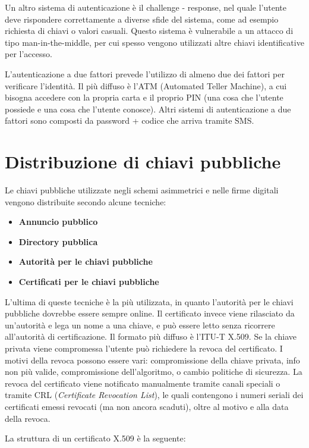 \begin{itemize}
\end{itemize}
Un altro sistema di autenticazione è il challenge - response, nel quale l'utente deve rispondere correttamente a diverse sfide del sistema, come ad esempio richiesta di chiavi o valori casuali. Questo sistema è vulnerabile a un attacco di tipo man-in-the-middle, per cui spesso vengono utilizzati altre chiavi identificative per l'accesso.

L'autenticazione a due fattori prevede l'utilizzo di almeno due dei fattori per verificare l'identità. Il più diffuso è l'ATM (Automated Teller Machine), a cui bisogna accedere con la propria carta e il proprio PIN (una cosa che l'utente possiede e una cosa che l'utente conosce). Altri sistemi di autenticazione a due fattori sono composti da password + codice che arriva tramite SMS.  

\section{Distribuzione di chiavi pubbliche}
Le chiavi pubbliche utilizzate negli schemi asimmetrici e nelle firme digitali vengono distribuite secondo alcune tecniche:
\begin{itemize}
    \item \textbf{Annuncio pubblico}
    \item \textbf{Directory pubblica}
    \item \textbf{Autorità per le chiavi pubbliche}
    \item \textbf{Certificati per le chiavi pubbliche}
\end{itemize}
L'ultima di queste tecniche è la più utilizzata, in quanto l'autorità per le chiavi pubbliche dovrebbe essere sempre online. Il certificato invece viene rilasciato da un'autorità e lega un nome a una chiave, e può essere letto senza ricorrere all'autorità di certificazione. Il formato più diffuso è l'ITU-T X.509. Se la chiave privata viene compromessa l'utente può richiedere la revoca del certificato. I motivi della revoca possono essere vari: compromissione della chiave privata, info non più valide, compromissione dell'algoritmo, o cambio politiche di sicurezza. La revoca del certificato viene notificato manualmente tramite canali speciali o tramite CRL (\textit{Certificate Revocation List}), le quali contengono i numeri seriali dei certificati emessi revocati (ma non ancora scaduti), oltre al motivo e alla data della revoca. 

La struttura di un certificato X.509 è la seguente:

